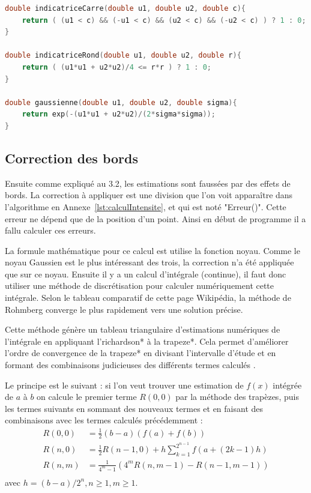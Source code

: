 \documentclass[stage2a]{tnreport}
\begin{document}
\begin{lstlisting}[language=C++, caption={Fonctions des noyaux carré, rond et Gaussien}, label={lst:fonctionsNoyaux}]
double indicatriceCarre(double u1, double u2, double c){
	return ( (u1 < c) && (-u1 < c) && (u2 < c) && (-u2 < c) ) ? 1 : 0;
}

double indicatriceRond(double u1, double u2, double r){
	return ( (u1*u1 + u2*u2)/4 <= r*r ) ? 1 : 0;
}

double gaussienne(double u1, double u2, double sigma){
	return exp(-(u1*u1 + u2*u2)/(2*sigma*sigma));
}
\end{lstlisting}


\subsection{Correction des bords}

Ensuite comme expliqué au 3.2, les estimations sont faussées par des effets de bords. La correction à appliquer est une division que l'on voit apparaître dans l'algorithme en Annexe~\ref{lst:calculIntensite}, et qui est noté "Erreur()". Cette erreur ne dépend que de la position d'un point. Ainsi en début de programme il a fallu calculer ces erreurs.

La formule mathématique pour ce calcul est utilise la fonction noyau. Comme le noyau Gaussien est le plus intéressant des trois, la correction n'a été appliquée que sur ce noyau. Ensuite il y a un calcul d'intégrale (continue), il faut donc utiliser une méthode de discrétisation pour calculer numériquement cette intégrale. Selon le tableau comparatif de cette page Wikipédia\cite{Integrales}, la méthode de Rohmberg converge le plus rapidement vers une solution précise.

Cette méthode génère un tableau triangulaire d'estimations numériques de l'intégrale en appliquant l'\gls{richardson}* à la \gls{trapeze}*. Cela permet d'améliorer l'ordre de convergence de la \gls{trapeze}* en divisant l'intervalle d'étude et en formant des combinaisons judicieuses des différents termes calculés \cite{Rohmberg}.

Le principe est le suivant : si l'on veut trouver une estimation de $f(x)$ intégrée de $a$ à $b$ on calcule le premier terme $R(0,0)$ par la méthode des trapèzes, puis les termes suivants en sommant des nouveaux termes et en faisant des combinaisons avec les termes calculés précédemment : 
\begin{align*}
R(0,0) &= \frac{1}{2}(b - a)(f(a) + f(b))\\
R(n,0) &= \frac{1}{2}R(n-1,0) + h \sum_{k=1}^{2^{n-1}}f(a + (2k - 1)h)\\
R(n,m) &= \frac{1}{4^m-1}(4^m R(n,m-1) - R(n-1,m-1))\\
\end{align*}
avec \begin{math}h = (b-a)/2^n, n \geq 1, m \geq 1\end{math}.
\end{document}
